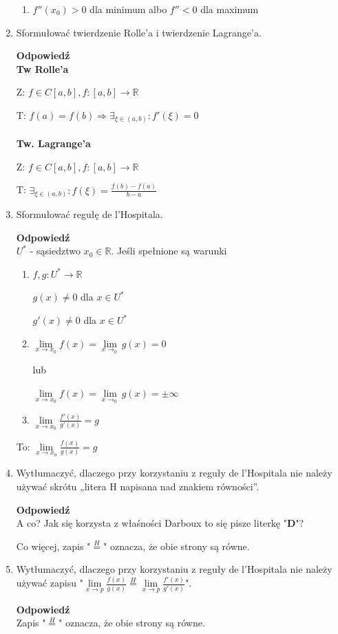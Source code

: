 \documentclass[12pt,a4paper]{article}
\newcounter{twierdzenie}
\theoremstyle{break}
\newcommand{\Odp}[1]{
		\begin{mdframed}[style=zadanie]
			\textbf{Odpowiedź}\\
			#1
		\end{mdframed}
	}
\begin{document}
\begin{enumerate}[1.]
{\begin{enumerate}[1)]
			\item $f''(x_0)>0$ dla minimum albo $f''<0$ dla maximum
		\end{enumerate}
	}
	
	\item Sformułować twierdzenie Rolle’a i twierdzenie Lagrange’a.
	\Odp{
		\textbf{Tw Rolle'a}
		
		Z: $f\in C[a,b], f:[a,b]\rightarrow\mathbb{R}$
		
		T: $f(a)=f(b)\Rightarrow \exists_{\xi\in(a,b)}: f'(\xi)=0$\\\\
		
		\textbf{Tw. Lagrange'a}
		
		Z: $f\in C[a,b], f:[a,b]\rightarrow\mathbb{R}$
		
		T: $\exists_{\xi \in (a,b)}: f(\xi)=\frac{f(b)-f(a)}{b-a}$
	}
	
	\item Sformułować regułę de l’Hospitala.
	\Odp{
		$U^*$ - sąsiedztwo $x_0\in\mathbb{R}$. Jeśli spełnione są warunki
		\begin{enumerate}[1)]
			\item $f,g:U^* \rightarrow \mathbb{R}$
			
			$g(x)\neq 0$ dla $x\in U^*$
			
			$g'(x)\neq 0$ dla $x\in U^*$
			
			\item $\lim\limits_{x\rightarrow x_0}f(x)=\lim\limits_{x\rightarrow _0}g(x)=0$
			
			lub
			
			$\lim\limits_{x\rightarrow x_0}f(x)=\lim\limits_{x\rightarrow _0}g(x)=\pm\infty$
			
			\item $\lim\limits_{x\rightarrow x_0} \frac{f'(x)}{g'(x)}=g$
		\end{enumerate}
	
		To: $\lim\limits_{x\rightarrow x_0} \frac{f(x)}{g(x)}=g$
	}
	\newpage
	\item Wytłumaczyć, dlaczego przy korzystaniu z reguły de l’Hospitala nie należy używać skrótu „litera H napisana nad znakiem równości”.
	\Odp{
		A co? Jak się korzysta z właśności Darboux to się pisze literkę "\textbf{D}"?
		
		Co więcej, zapis "$\overset{H}{=}$" oznacza, że obie strony są równe.
	}
	
	\item Wytłumaczyć, dlaczego przy korzystaniu z reguły de l’Hospitala nie należy używać zapisu "$\lim\limits_{x\rightarrow p} \frac{f(x)}{g(x)} \overset{H}{=} \lim\limits_{x\rightarrow p} \frac{f'(x)}{g'(x)}$".
	\Odp{
		Zapis "$\overset{H}{=}$" oznacza, że obie strony są równe.
	}
	

\end{enumerate}
\end{document}
